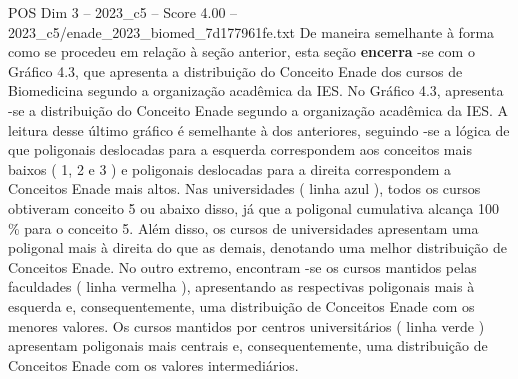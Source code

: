 \begin{textsample}{POS Dim 3 – 2023\_c5 – Score 4.00 – 2023\_c5/enade\_2023\_biomed\_7d177961fe.txt}
De maneira semelhante à forma como se procedeu em relação à seção anterior, esta seção \textbf{encerra} -se com o Gráfico 4.3, que apresenta a distribuição do Conceito Enade dos cursos de Biomedicina segundo a organização acadêmica da IES.
No Gráfico 4.3, apresenta -se a distribuição do Conceito Enade segundo a organização acadêmica da IES.
A leitura desse último gráfico é semelhante à dos anteriores, seguindo -se a lógica de que poligonais deslocadas para a esquerda correspondem aos conceitos mais baixos ( 1, 2 e 3 ) e poligonais deslocadas para a direita correspondem a Conceitos Enade mais altos.
Nas universidades ( linha azul ), todos os cursos obtiveram conceito 5 ou abaixo disso, já que a poligonal cumulativa alcança 100 \% para o conceito 5.
Além disso, os cursos de universidades apresentam uma poligonal mais à direita do que as demais, denotando uma melhor distribuição de Conceitos Enade.
No outro extremo, encontram -se os cursos mantidos pelas faculdades ( linha vermelha ), apresentando as respectivas poligonais mais à esquerda e, consequentemente, uma distribuição de Conceitos Enade com os menores valores.
Os cursos mantidos por centros universitários ( linha verde ) apresentam poligonais mais centrais e, consequentemente, uma distribuição de Conceitos Enade com os valores intermediários.

\end{textsample}
